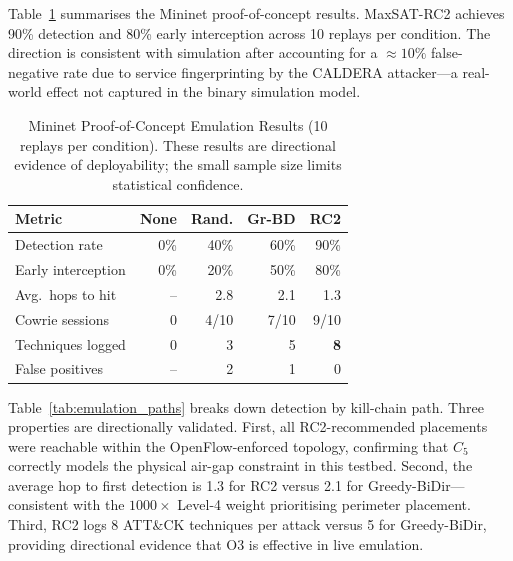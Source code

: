 \documentclass[journal]{IEEEtran}
\begin{document}
Table~\ref{tab:emulation} summarises the Mininet proof-of-concept
results. MaxSAT-RC2 achieves 90\% detection and 80\% early
interception across 10 replays per condition. The direction is
consistent with simulation after accounting for a $\approx10\%$
false-negative rate due to service fingerprinting by the CALDERA
attacker---a real-world effect not captured in the binary simulation
model.

\begin{table}[t]
\caption{Mininet Proof-of-Concept Emulation Results
  (10 replays per condition). These results are directional evidence
  of deployability; the small sample size limits statistical
  confidence.}
\label{tab:emulation}
\centering
\renewcommand{\arraystretch}{1.2}
\begin{tabular}{p{2.6cm}rrrr}
\toprule
Metric & None & Rand. & Gr-BD & RC2 \\
\midrule
Detection rate     & 0\%  & 40\%  & 60\%  & 90\% \\
Early interception & 0\%  & 20\%  & 50\%  & 80\% \\
Avg.\ hops to hit  & --   & 2.8   & 2.1   & 1.3  \\
Cowrie sessions    & 0    & 4/10  & 7/10  & 9/10 \\
Techniques logged  & 0    & 3     & 5     & \textbf{8}    \\
False positives    & --   & 2     & 1     & 0    \\
\bottomrule
\end{tabular}
\end{table}

Table~\ref{tab:emulation_paths} breaks down detection by kill-chain
path. Three properties are directionally validated. First, all
RC2-recommended placements were reachable within the
OpenFlow-enforced topology, confirming that $C_5$ correctly models
the physical air-gap constraint in this testbed. Second, the average
hop to first detection is 1.3 for RC2 versus 2.1 for
Greedy-BiDir---consistent with the $1000\times$ Level-4 weight
prioritising perimeter placement. Third, RC2 logs 8 ATT\&CK
techniques per attack versus 5 for Greedy-BiDir, providing
directional evidence that O3 is effective in live emulation.
\end{document}
